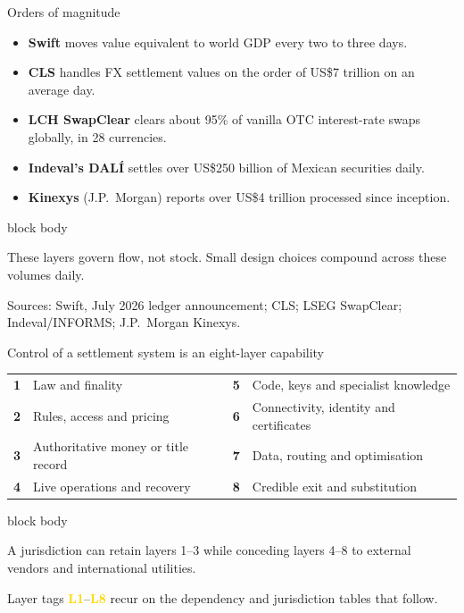 \documentclass[aspectratio=169,12pt]{beamer}
\newcommand{\rust}[1]{\textcolor{Rust}{\textbf{#1}}}
\newcommand{\muted}[1]{\textcolor{Quiet}{#1}}
\newcommand{\source}[1]{\vfill\par\fontsize{5.4}{6.5}\selectfont\color{Quiet}Sources: #1}
\newcommand{\tightitems}{\setlength{\itemsep}{0.42em}\setlength{\parskip}{0pt}}
\newcommand{\lyr}[1]{\textcolor{Gold}{\fontsize{7.3}{8.4}\selectfont\bfseries L#1}}
\newenvironment{statement}{%
  \begin{beamercolorbox}[sep=.18cm,rounded=false,wd=\linewidth]{block body}%
  \fontsize{13}{15.5}\selectfont\bfseries
}{\end{beamercolorbox}}
\begin{document}
\begin{frame}{Orders of magnitude} %
  \begin{itemize}\tightitems
    \item \rust{Swift} moves value equivalent to world GDP every two to three days.
    \item \rust{CLS} handles FX settlement values on the order of US\$7 trillion on an average day.
    \item \rust{LCH SwapClear} clears about 95\% of vanilla OTC interest-rate swaps globally, in 28 currencies.
    \item \rust{Indeval's DAL\'I} settles over US\$250 billion of Mexican securities daily.
    \item \rust{Kinexys} (J.P.\ Morgan) reports over US\$4 trillion processed since inception.
  \end{itemize}
  \vspace{0.22cm}
  \begin{statement}
    These layers govern flow, not stock. Small design choices compound across these volumes daily.
  \end{statement}
  \source{Swift, July 2026 ledger announcement; CLS; LSEG SwapClear; Indeval/INFORMS; J.P.\ Morgan Kinexys.}
\end{frame}

\begin{frame}{Control of a settlement system is an eight-layer capability}
  \begin{tabularx}{\textwidth}{L{0.48cm}Y L{0.48cm}Y}
    \textcolor{Rust}{\textbf{1}} & Law and finality & \textcolor{Rust}{\textbf{5}} & Code, keys and specialist knowledge \\
    \addlinespace[0.35em]
    \textcolor{Rust}{\textbf{2}} & Rules, access and pricing & \textcolor{Rust}{\textbf{6}} & Connectivity, identity and certificates \\
    \addlinespace[0.35em]
    \textcolor{Rust}{\textbf{3}} & Authoritative money or title record & \textcolor{Rust}{\textbf{7}} & Data, routing and optimisation \\
    \addlinespace[0.35em]
    \textcolor{Rust}{\textbf{4}} & Live operations and recovery & \textcolor{Rust}{\textbf{8}} & Credible exit and substitution \\
  \end{tabularx}
  \vspace{0.30cm}
  \begin{statement}
    A jurisdiction can retain layers 1--3 while conceding layers 4--8 to external vendors and international utilities.
  \end{statement}
  \vspace{0.12cm}
  \muted{\fontsize{9.2}{11}\selectfont Layer tags \lyr{1}--\lyr{8} recur on the dependency and jurisdiction tables that follow.}
\end{frame}
\end{document}
